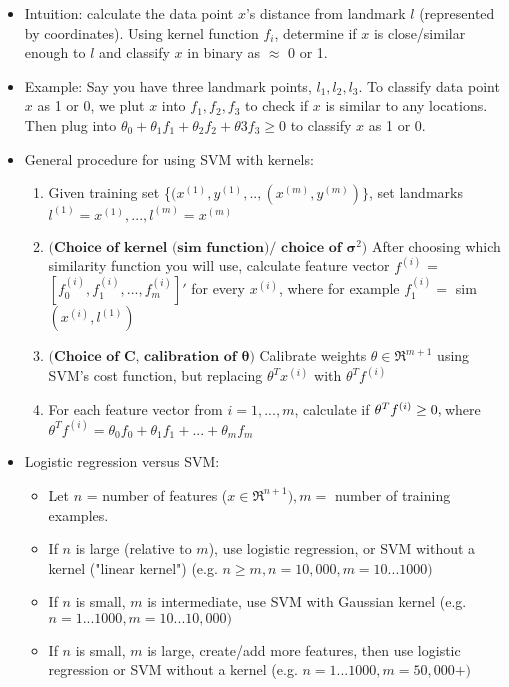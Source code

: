 \documentclass[titlepage]{article}
\begin{document}
\begin{itemize}
\item Intuition: calculate the data point $x$'s distance from landmark $l$ (represented by coordinates). Using kernel function $f_i$, determine if $x$ is close/similar enough to $l$ and classify $x$ in binary as $\approx$ 0 or 1.

\item Example: Say you have three landmark points, ${l_1, l_2, l_3}$. To classify data point $x$ as 1 or 0, we plut $x$ into $f_1, f_2, f_3$ to check if $x$ is similar to any locations. Then plug into $\theta_0 + \theta_1f_1 + \theta_2f_2 + \theta3f_3 \geq 0$ to classify $x$ as 1 or 0.

\item General procedure for using SVM with kernels:
\begin{enumerate}
\item Given training set \{$(x^{(1)}, y^{(1)},..,(x^{(m)}, y^{(m)})\}$, set landmarks $l^{(1)} = x^{(1)},...,l^{(m)} = x^{(m)}$
\item $\textbf{(Choice of kernel (sim function)/ choice of } \boldsymbol\sigma^2)$ After choosing which similarity function you will use, calculate feature vector $f^{(i)}$ = $[f_0^{(i)}, f_1^{(i)},...,f_m^{(i)}]'$ for every $x^{(i)}$, where for example $f_1^{(i)} = $ sim$(x^{(i)}, l^{(1)})$
\item $\textbf{(Choice of C, calibration of } \boldsymbol\theta)$ Calibrate weights $\theta \in \Re^{m+1}$ using SVM's cost function, but replacing $\theta^Tx^{(i)}$ with $\theta^T f^{(i)}$
\item For each feature vector from $i=1,...,m$, calculate if $\theta^T f^{(i)} \geq 0, \\$where $\theta^T f^{(i)} = \theta_0 f_0 + \theta_1 f_1 +...+\theta_m f_m$
\end{enumerate}

\item Logistic regression versus SVM:
\begin{itemize} [label = $\bullet$]
\item Let $n$ = number of features ($x \in \Re^{n+1}), m= $ number of training examples.
\item If $n$ is large (relative to $m$), use logistic regression, or SVM without a kernel ("linear kernel") (e.g. $n\geq m, n = 10,000, m = 10...1000)$
\item If $n$ is small, $m$ is intermediate, use SVM with Gaussian kernel (e.g. $n=1...1000, m = 10...10,000)$
\item If $n$ is small, $m$ is large, create/add more features, then use logistic regression or SVM without a kernel (e.g. $n=1...1000, m=50,000+)$
\end{itemize}


\end{itemize}
\end{document}
